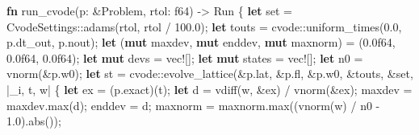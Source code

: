 \documentclass[
  10pt,
]{article}
\newenvironment{Shaded}{}{}
\newcommand{\DataTypeTok}[1]{\textcolor[rgb]{0.56,0.13,0.00}{#1}}
\newcommand{\DecValTok}[1]{\textcolor[rgb]{0.25,0.63,0.44}{#1}}
\newcommand{\KeywordTok}[1]{\textcolor[rgb]{0.00,0.44,0.13}{\textbf{#1}}}
\newcommand{\NormalTok}[1]{#1}
\newcommand{\OperatorTok}[1]{\textcolor[rgb]{0.40,0.40,0.40}{#1}}
\newcommand{\PreprocessorTok}[1]{\textcolor[rgb]{0.74,0.48,0.00}{#1}}
\begin{document}
\begin{Shaded}
\begin{Highlighting}[]
\KeywordTok{fn}\NormalTok{ run\_cvode(p}\OperatorTok{:} \OperatorTok{\&}\NormalTok{Problem}\OperatorTok{,}\NormalTok{ rtol}\OperatorTok{:} \DataTypeTok{f64}\NormalTok{) }\OperatorTok{{-}\textgreater{}}\NormalTok{ Run }\OperatorTok{\{}
    \KeywordTok{let}\NormalTok{ set }\OperatorTok{=} \PreprocessorTok{CvodeSettings::}\NormalTok{adams(rtol}\OperatorTok{,}\NormalTok{ rtol }\OperatorTok{/} \DecValTok{100.0}\NormalTok{)}\OperatorTok{;}
    \KeywordTok{let}\NormalTok{ touts }\OperatorTok{=} \PreprocessorTok{cvode::}\NormalTok{uniform\_times(}\DecValTok{0.0}\OperatorTok{,}\NormalTok{ p}\OperatorTok{.}\NormalTok{dt\_out}\OperatorTok{,}\NormalTok{ p}\OperatorTok{.}\NormalTok{nout)}\OperatorTok{;}
    \KeywordTok{let}\NormalTok{ (}\KeywordTok{mut}\NormalTok{ maxdev}\OperatorTok{,} \KeywordTok{mut}\NormalTok{ enddev}\OperatorTok{,} \KeywordTok{mut}\NormalTok{ maxnorm) }\OperatorTok{=}\NormalTok{ (}\DecValTok{0.0f64}\OperatorTok{,} \DecValTok{0.0f64}\OperatorTok{,} \DecValTok{0.0f64}\NormalTok{)}\OperatorTok{;}
    \KeywordTok{let} \KeywordTok{mut}\NormalTok{ devs }\OperatorTok{=} \PreprocessorTok{vec!}\NormalTok{[]}\OperatorTok{;}
    \KeywordTok{let} \KeywordTok{mut}\NormalTok{ states }\OperatorTok{=} \PreprocessorTok{vec!}\NormalTok{[]}\OperatorTok{;}
    \KeywordTok{let}\NormalTok{ n0 }\OperatorTok{=}\NormalTok{ vnorm(}\OperatorTok{\&}\NormalTok{p}\OperatorTok{.}\NormalTok{w0)}\OperatorTok{;}
    \KeywordTok{let}\NormalTok{ st }\OperatorTok{=} \PreprocessorTok{cvode::}\NormalTok{evolve\_lattice(}\OperatorTok{\&}\NormalTok{p}\OperatorTok{.}\NormalTok{lat}\OperatorTok{,} \OperatorTok{\&}\NormalTok{p}\OperatorTok{.}\NormalTok{fl}\OperatorTok{,} \OperatorTok{\&}\NormalTok{p}\OperatorTok{.}\NormalTok{w0}\OperatorTok{,} \OperatorTok{\&}\NormalTok{touts}\OperatorTok{,} \OperatorTok{\&}\NormalTok{set}\OperatorTok{,} \OperatorTok{|}\NormalTok{\_i}\OperatorTok{,}\NormalTok{ t}\OperatorTok{,}\NormalTok{ w}\OperatorTok{|} \OperatorTok{\{}
        \KeywordTok{let}\NormalTok{ ex }\OperatorTok{=}\NormalTok{ (p}\OperatorTok{.}\NormalTok{exact)(t)}\OperatorTok{;}
        \KeywordTok{let}\NormalTok{ d }\OperatorTok{=}\NormalTok{ vdiff(w}\OperatorTok{,} \OperatorTok{\&}\NormalTok{ex) }\OperatorTok{/}\NormalTok{ vnorm(}\OperatorTok{\&}\NormalTok{ex)}\OperatorTok{;}
\NormalTok{        maxdev }\OperatorTok{=}\NormalTok{ maxdev}\OperatorTok{.}\NormalTok{max(d)}\OperatorTok{;}
\NormalTok{        enddev }\OperatorTok{=}\NormalTok{ d}\OperatorTok{;}
\NormalTok{        maxnorm }\OperatorTok{=}\NormalTok{ maxnorm}\OperatorTok{.}\NormalTok{max((vnorm(w) }\OperatorTok{/}\NormalTok{ n0 }\OperatorTok{{-}} \DecValTok{1.0}\NormalTok{)}\OperatorTok{.}\NormalTok{abs())}\OperatorTok{;}

\end{Highlighting}
\end{Shaded}
\end{document}
